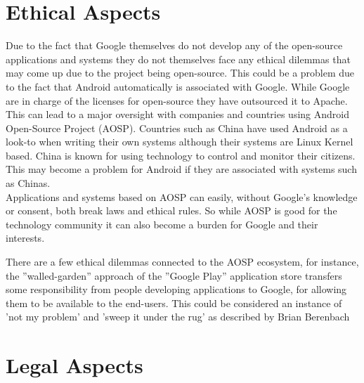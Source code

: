 \documentclass[conference]{IEEEtran}
\begin{document}
\section{Ethical Aspects}
\label{ethics}

Due to the fact that Google themselves do not develop any of the open-source applications and systems they do not themselves face any ethical dilemmas that may come up due to the project being open-source. This could be a problem due to the fact that Android automatically is associated with Google. While Google are in charge of the licenses for open-source they have outsourced it to Apache.\cite{android-licenses} This can lead to a major oversight with companies and countries using Android Open-Source Project (AOSP). Countries such as China have used Android as a look-to when writing their own systems\cite{country-license} although their systems are Linux Kernel based. China is known for using technology to control and monitor their citizens. This may become a problem for Android if they are associated with systems such as Chinas.
\\Applications and systems based on AOSP can easily, without Google's knowledge or consent, both break laws and ethical rules. So while AOSP is good for the technology community it can also become a burden for Google and their interests.

There are a few ethical dilemmas connected to the AOSP ecosystem, for instance, the ''walled-garden'' approach of the ''Google Play'' application store transfers some responsibility from people developing applications to Google, for allowing them to be available to the  end-users. This could be considered an instance of 'not my problem' and 'sweep it under the rug' as described by Brian Berenbach

\section{Legal Aspects}
\label{legal}
\end{document}
